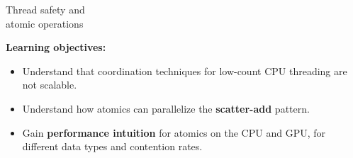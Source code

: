 \begin{frame}[fragile]

  \vspace{-10pt}

  {\Huge Thread safety and \\ atomic operations}

  \vspace{10pt}

  \textbf{Learning objectives:}
  \begin{itemize}
    \item{Understand that coordination techniques for low-count CPU threading are not scalable.}
    \item{Understand how atomics can parallelize the \textbf{scatter-add} pattern.}
    \item{Gain \textbf{performance intuition} for atomics on the CPU and GPU, for different data types and contention rates.}
  \end{itemize}

  \vspace{-20pt}

\end{frame}


